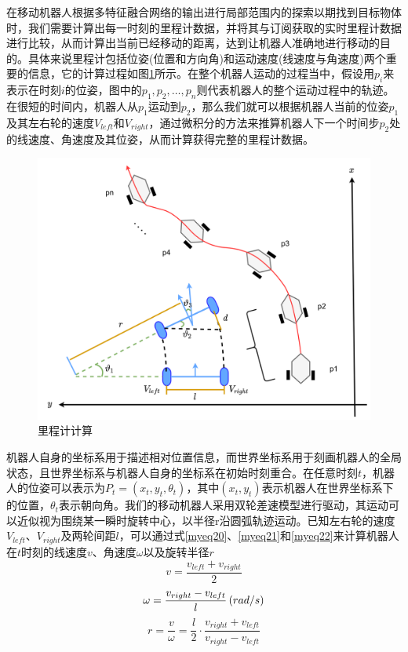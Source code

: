 在移动机器人根据多特征融合网络的输出进行局部范围内的探索以期找到目标物体时，我们需要计算出每一时刻的里程计数据，并将其与订阅获取的实时里程计数据进行比较，从而计算出当前已经移动的距离，达到让机器人准确地进行移动的目的。具体来说里程计包括位姿(位置和方向角)和运动速度(线速度与角速度)两个重要的信息，它的计算过程如图\ref{motion_calculate}所示。在整个机器人运动的过程当中，假设用${p_i}$来表示在时刻$i$的位姿，图中的${p_1},{p_2}, \ldots ,{p_n}$则代表机器人的整个运动过程中的轨迹。在很短的时间内，机器人从${p_1}$运动到${p_2}$，那么我们就可以根据机器人当前的位姿${p_1}$及其左右轮的速度${V_{left}}$和${V_{right}}$，通过微积分的方法来推算机器人下一个时间步${p_2}$处的线速度、角速度及其位姿，从而计算获得完整的里程计数据。
\begin{figure}[htbp]
    \centering
    \includegraphics[scale=0.05]{Fig/移动控制.png}
    \caption{\label{motion_calculate}里程计计算}
\end{figure}

机器人自身的坐标系用于描述相对位置信息，而世界坐标系用于刻画机器人的全局状态，且世界坐标系与机器人自身的坐标系在初始时刻重合。在任意时刻$t$，机器人的位姿可以表示为${P_t} = \left( {{x_t},{y_t},{\theta _t}} \right)$，其中$\left( {{x_t},{y_t}} \right)$表示机器人在世界坐标系下的位置，${{\theta _t}}$表示朝向角。我们的移动机器人采用双轮差速模型进行驱动，其运动可以近似视为围绕某一瞬时旋转中心，以半径r沿圆弧轨迹运动。已知左右轮的速度${V_{left}}$、${V_{right}}$及两轮间距$l$，可以通过式\eqref{myeq20}、\eqref{myeq21}和\eqref{myeq22}来计算机器人在$t$时刻的线速度$v$、角速度$\omega $以及旋转半径$r$
\begin{equation}
    v = \frac{{{v_{left}} + {v_{right}}}}{2}
    \label{myeq20}
\end{equation}
\begin{equation}
    \omega  = \frac{{{v_{right}} - {v_{left}}}}{l}\left( {{{rad} \mathord{\left/
 {\vphantom {{rad} s}} \right.
 \kern-\nulldelimiterspace} s}} \right)
    \label{myeq21}
\end{equation}
\begin{equation}
    r = \frac{v}{\omega } = \frac{l}{2} \cdot \frac{{{v_{right}} + {v_{left}}}}{{{v_{right}} - {v_{left}}}}
    \label{myeq22}
\end{equation}

